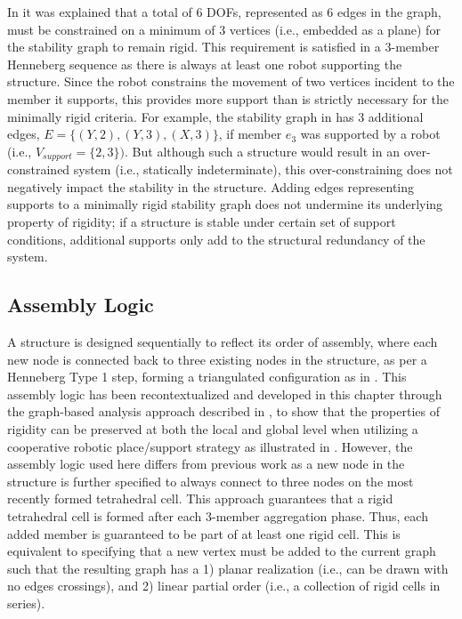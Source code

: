     In  it was explained that a total of 6 DOFs, represented as 6 edges in the graph, must be constrained on a minimum of 3 vertices (i.e., embedded as a plane) for the stability graph to remain rigid. This requirement is satisfied in a 3-member Henneberg sequence as there is always at least one robot supporting the structure. Since the robot constrains the movement of two vertices incident to the member it supports, this provides more support than is strictly necessary for the minimally rigid criteria. For example, the stability graph in  has 3 additional edges, $E = \{(Y,2),(Y,3),(X,3)\}$, if member $e_3$ was supported by a robot (i.e., $V_{support} = \{2,3\})$. But although such a structure would result in an over-constrained system (i.e., statically indeterminate), this over-constraining does not negatively impact the stability in the structure. Adding edges representing supports to a minimally rigid stability graph does not undermine its underlying property of rigidity; if a structure is stable under certain set of support conditions, additional supports only add to the structural redundancy of the system.
    

\subsection{Assembly Logic} \label{sec:4__approach}
    A structure is designed sequentially to reflect its order of assembly, where each new node is connected back to three existing nodes in the structure, as per a Henneberg Type 1 step, forming a triangulated configuration as in \citep[pg. 52-53]{parascho_cooperative_2019}. This assembly logic has been recontextualized and developed in this chapter through the graph-based analysis approach described in , to show that the properties of rigidity can be preserved at both the local and global level when utilizing a cooperative robotic place/support strategy as illustrated in . However, the assembly logic used here differs from previous work \citep{parascho_cooperative_2019} as a new node in the structure is further specified to always connect to three nodes on the most recently formed tetrahedral cell. This approach guarantees that a rigid tetrahedral cell is formed after each 3-member aggregation phase. Thus, each added member is guaranteed to be part of at least one rigid cell. This is equivalent to specifying that a new vertex must be added to the current graph such that the resulting graph has a 1) planar realization (i.e., can be drawn with no edges crossings), and 2) linear partial order (i.e., a collection of rigid cells in series). 
    
